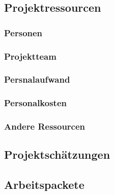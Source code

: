 \subsection{ Projektressourcen }
\subsubsection{ Personen }
\subsubsection{ Projektteam }
\subsubsection{ Persnalaufwand }
\subsubsection{ Personalkosten }
\subsubsection{ Andere Ressourcen }
\subsection{ Projektschätzungen }
\subsection{ Arbeitspackete}


